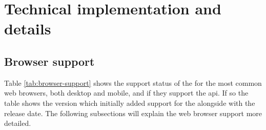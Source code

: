 \section{Technical implementation and details}

\newpage
\subsection{Browser support}

Table \ref{tab:browser-support} shows the support status of the \wa{} for the most common web browsers, both desktop and mobile, and if they support the \gls{api}. If so the table shows the version which initially added support for the \wa{} alongside with the release date. The following subsections will explain the web browser support more detailed.

